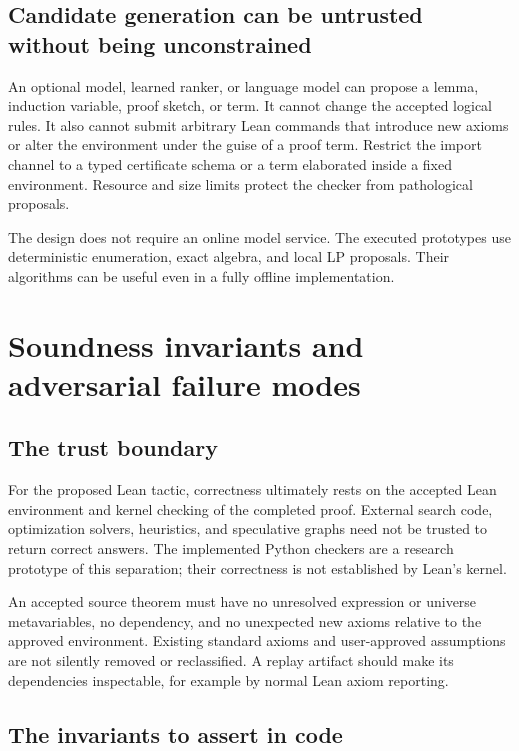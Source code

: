 \subsection{Candidate generation can be untrusted without being unconstrained}

An optional model, learned ranker, or language model can propose a lemma,
induction variable, proof sketch, or term. It cannot change the accepted
logical rules. It also cannot submit arbitrary Lean commands that introduce
new axioms or alter the environment under the guise of a proof term.
Restrict the import channel to a typed certificate schema or a term elaborated
inside a fixed environment. Resource and size limits protect the checker from
pathological proposals.

The design does not require an online model service. The executed prototypes
use deterministic enumeration, exact algebra, and local LP proposals. Their
algorithms can be useful even in a fully offline implementation.

\section{Soundness invariants and adversarial failure modes}

\subsection{The trust boundary}

For the proposed Lean tactic, correctness ultimately rests on the accepted
Lean environment and kernel checking of the completed proof. External search
code, optimization solvers, heuristics, and speculative graphs need not be
trusted to return correct answers. The implemented Python checkers are a
research prototype of this separation; their correctness is not established
by Lean's kernel.

An accepted source theorem must have no unresolved expression or universe
metavariables, no  dependency, and no unexpected new axioms relative
to the approved environment. Existing standard axioms and user-approved
assumptions are not silently removed or reclassified. A replay artifact should
make its dependencies inspectable, for example by normal Lean axiom reporting.

\subsection{The invariants to assert in code}


